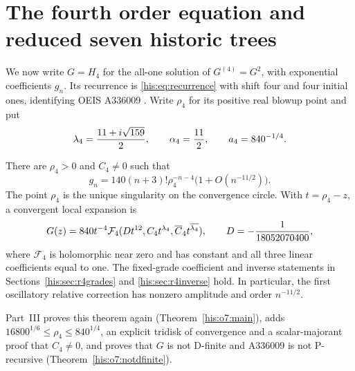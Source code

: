 \section{The fourth order equation and reduced seven historic trees}\label{his:sec:r4}
We now write $G=H_4$ for the all-one solution of $G^{(4)}=G^2$, with exponential coefficients $g_n$. Its recurrence is \eqref{his:eq:recurrence} with shift four and four initial ones, identifying OEIS A336009 \cite{oeisr4}. Write $\rho_4$ for its positive real blowup point and put
\begin{equation}\label{his:eq:r4constants}
 \lambda_4=\frac{11+i\sqrt{159}}2,\qquad \alpha_4=\frac{11}2,
 \qquad a_4=840^{-1/4}.
\end{equation}

\begin{theorem}\label{his:thm:r4}
There are $\rho_4>0$ and $C_4\ne0$ such that
\begin{equation}\label{his:eq:r4count}
 g_n=140(n+3)!\rho_4^{-n-4}\bigl(1+O(n^{-11/2})\bigr).
\end{equation}
The point $\rho_4$ is the unique singularity on the convergence circle. With $t=\rho_4-z$, a convergent local expansion is
\begin{equation}\label{his:eq:r4local}
 G(z)=840t^{-4}\mathcal F_4(Dt^{12},C_4t^{\lambda_4},\overline C_4t^{\overline{\lambda_4}}),
 \qquad D=-\frac1{18052070400},
\end{equation}
where $\mathcal F_4$ is holomorphic near zero and has constant and all three linear coefficients equal to one. The fixed-grade coefficient and inverse statements in Sections~\ref{his:sec:r4grades} and \ref{his:sec:r4inverse} hold. In particular, the first oscillatory relative correction has nonzero amplitude and order $n^{-11/2}$.
\end{theorem}
\begin{writenote}
Part~III proves this theorem again (Theorem~\ref{his:o7:main}), adds $16800^{1/6}\le\rho_4\le840^{1/4}$, an explicit tridisk of convergence and a scalar-majorant proof that $C_4\ne0$, and proves that $G$ is not D-finite and A336009 is not P-recursive (Theorem~\ref{his:o7:notdfinite}).
\end{writenote}



